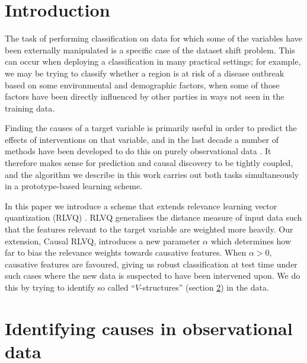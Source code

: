 \documentclass{esannV2}
\begin{document}
\section{Introduction}
\label{sec:Introduction}

The task of performing classification on data for which some of the variables have been externally manipulated is a specific case of the dataset shift problem. This can occur when deploying a classification in many practical settings; for example, we may be trying to classify whether a region is at risk of a disease outbreak based on some environmental and demographic factors, when some of those factors have been directly influenced by other parties in ways not seen in the training data.

Finding the causes of a target variable is primarily useful in order to predict the effects of interventions on that variable, and in the last decade a number of methods have been developed to do this on purely observational data \cite{06}. It therefore makes sense for prediction and causal discovery to be tightly coupled, and the algorithm we describe in this work carries out both tasks simultaneously in a prototype-based learning scheme.

In this paper we introduce a scheme that extends relevance learning vector quantization (RLVQ) \cite{08}. RLVQ generalises the distance measure of input data such that the features relevant to the target variable are weighted more heavily. Our extension, Causal RLVQ, introduces a new parameter $\alpha$ which determines how far to bias the relevance weights towards causative features. When $\alpha>0$, causative features are favoured, giving us robust classification at test time under such cases where the new data is suspected to have been intervened upon. We do this by trying to identify so called ``$V$-structures'' (section \ref{sec:IdentifyingCausesInObservationalData}) in the data.



\section{Identifying causes in observational data}
\label{sec:IdentifyingCausesInObservationalData}
\end{document}
